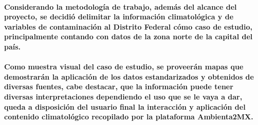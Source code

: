     \paragraph{Considerando la metodología de trabajo, además del alcance del proyecto, se decidió delimitar la información climatológica y de variables de contaminación al Distrito Federal cómo caso de estudio, principalmente contando con datos de la zona norte de la capital del país.}
    \paragraph{Como muestra visual del caso de estudio, se proveerán mapas que demostrarán la aplicación de los datos estandarizados y obtenidos de diversas fuentes, cabe destacar, que la información puede tener diversas interpretaciones dependiendo el uso que se le vaya a dar, queda a disposición del usuario final la interacción y aplicación del contenido climatológico recopilado por la plataforma Ambienta2MX.}

